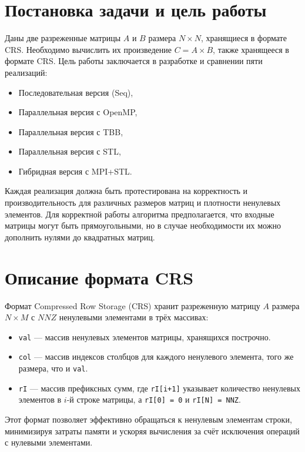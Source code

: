 \documentclass[a4paper,12pt]{article}
\begin{document}
\section{Постановка задачи и цель работы}
Даны две разреженные матрицы \( A \) и \( B \) размера \( N \times N \), хранящиеся в формате CRS. Необходимо вычислить их произведение \( C = A \times B \), также хранящееся в формате CRS. Цель работы заключается в разработке и сравнении пяти реализаций:
\begin{itemize}
    \item Последовательная версия (Seq),
    \item Параллельная версия с OpenMP,
    \item Параллельная версия с TBB,
    \item Параллельная версия с STL,
    \item Гибридная версия с MPI+STL.
\end{itemize}
Каждая реализация должна быть протестирована на корректность и производительность для различных размеров матриц и плотности ненулевых элементов. Для корректной работы алгоритма предполагается, что входные матрицы могут быть прямоугольными, но в случае необходимости их можно дополнить нулями до квадратных матриц.

\section{Описание формата CRS}
Формат Compressed Row Storage (CRS) хранит разреженную матрицу \( A \) размера \( N \times M \) с \( NNZ \) ненулевыми элементами в трёх массивах:
\begin{itemize}
    \item \texttt{val} — массив ненулевых элементов матрицы, хранящихся построчно.
    \item \texttt{col} — массив индексов столбцов для каждого ненулевого элемента, того же размера, что и \texttt{val}.
    \item \texttt{rI} — массив префиксных сумм, где \texttt{rI[i+1]} указывает количество ненулевых элементов в \( i \)-й строке матрицы, а \texttt{rI[0] = 0} и \texttt{rI[N] = NNZ}.
\end{itemize}
Этот формат позволяет эффективно обращаться к ненулевым элементам строки, минимизируя затраты памяти и ускоряя вычисления за счёт исключения операций с нулевыми элементами.
\end{document}
